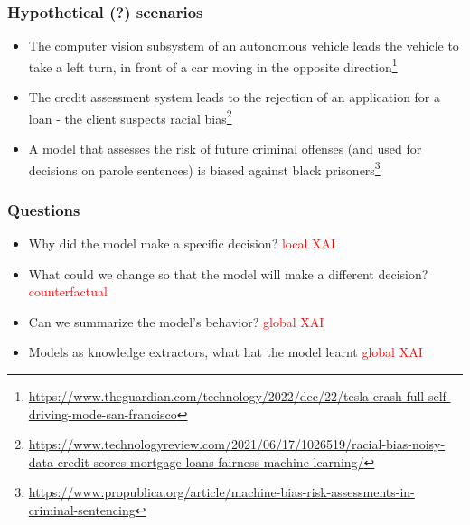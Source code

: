 \begin{frame}
  \frametitle{Hypothetical (?) scenarios}

  \begin{itemize}
  \item<1-> The computer vision subsystem of an autonomous vehicle leads the
    vehicle to take a left turn, in front of a car moving in the opposite direction\footnote{\url{https://www.theguardian.com/technology/2022/dec/22/tesla-crash-full-self-driving-mode-san-francisco}}
  \item<2-> The credit assessment system leads to the rejection of an
    application for a loan - the client suspects racial bias\footnote{\url{https://www.technologyreview.com/2021/06/17/1026519/racial-bias-noisy-data-credit-scores-mortgage-loans-fairness-machine-learning/}}
  \item<3-> A model that assesses the risk of future criminal offenses (and
    used for decisions on parole sentences) is biased against black
    prisoners\footnote{\url{https://www.propublica.org/article/machine-bias-risk-assessments-in-criminal-sentencing}}
  \end{itemize}

\end{frame}

\begin{frame}
  \frametitle{Questions}
  \begin{itemize}
  \item Why did the model make a specific decision? \textcolor{red}{local XAI}
  \item What could we change so that the model will make a different decision? \textcolor{red}{counterfactual}
  \item Can we summarize the model's behavior? \textcolor{red}{global XAI}
  \item Models as knowledge extractors, what hat the model learnt \textcolor{red}{global XAI}
  \end{itemize}
\end{frame}

